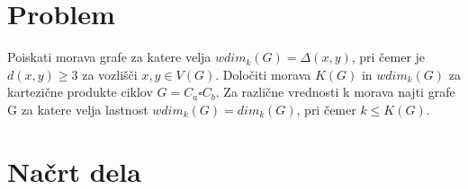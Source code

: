 \documentclass[a4paper,12pt]{article}
\begin{document}
\section{Problem} 
Poiskati morava grafe za katere velja $wdim_k(G) = \Delta (x,y)$, pri čemer je $d(x,y) \geq 3$ za vozlišči $x, y \in V(G)$.
Določiti morava $K(G)$ in $wdim_k(G)$ za kartezične produkte ciklov $G = C_a \square C_b$.
Za različne vrednosti k morava najti grafe G za katere velja lastnost $wdim_k(G) = dim_k(G)$, pri čemer $k \leq K(G)$.

\section{Načrt dela}
\end{document}
